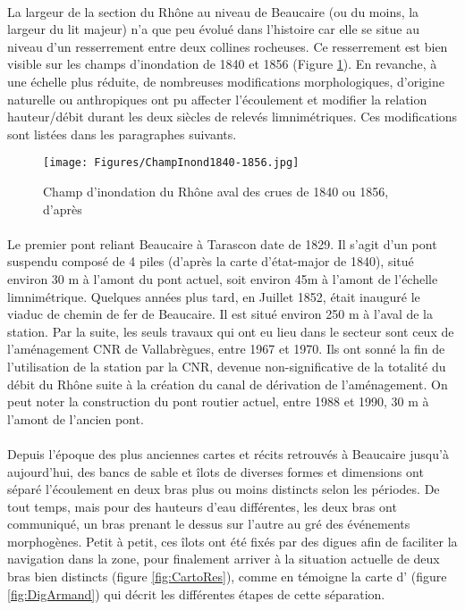 \documentclass[11pt]{article}
\begin{document}
    \paragraph{} La largeur de la section du Rhône au niveau de Beaucaire (ou du moins, la largeur du lit majeur) n'a que peu évolué dans l'histoire car elle se situe au niveau d'un resserrement entre deux collines rocheuses. Ce resserrement est bien visible sur les champs d'inondation de 1840 et 1856 (Figure \ref{Champ1856}). En revanche, à une échelle plus réduite, de nombreuses modifications morphologiques, d'origine naturelle ou anthropiques ont pu affecter l'écoulement et modifier la relation hauteur/débit durant les deux siècles de relevés limnimétriques. Ces modifications sont listées dans les paragraphes suivants.
    
    \begin{figure}[h]
        \centering
        \texttt{[image: Figures/ChampInond1840-1856.jpg]}
        \caption{Champ d'inondation du Rhône aval des crues de 1840 ou 1856, d'après \citet{parde_regime_1925}}
        \label{Champ1856}
    \end{figure}
    

	\paragraph{} Le premier pont reliant Beaucaire à Tarascon date de 1829. Il s'agit d'un pont suspendu composé de 4 piles (d'après la carte d'état-major de 1840), situé environ 30 m à l'amont du pont actuel, soit environ 45m à l'amont de l'échelle limnimétrique. Quelques années plus tard, en Juillet 1852, était inauguré le viaduc de chemin de fer de Beaucaire. Il est situé environ 250 m à l'aval de la station. Par la suite, les seuls travaux qui ont eu lieu dans le secteur sont ceux de l'aménagement CNR de Vallabrègues, entre 1967 et 1970. Ils ont sonné la fin de l'utilisation de la station par la CNR, devenue non-significative de la totalité du débit du Rhône suite à la création du canal de dérivation de l'aménagement. On peut noter la construction du pont routier actuel, entre 1988 et 1990, 30 m à l'amont de l'ancien pont. 
        

        \paragraph{} Depuis l'époque des plus anciennes cartes et récits retrouvés à Beaucaire jusqu'à aujourd'hui, des bancs de sable et îlots de diverses formes et dimensions ont séparé l'écoulement en deux bras plus ou moins distincts selon les périodes. De tout temps, mais pour des hauteurs d'eau différentes, les deux bras ont communiqué, un bras prenant le dessus sur l'autre au gré des événements morphogènes. Petit à petit, ces îlots ont été fixés par des digues afin de faciliter la navigation dans la zone, pour finalement arriver à la situation actuelle de deux bras bien distincts (figure \ref{fig:CartoRes}), comme en témoigne la carte d'\citet{armand_ii_1907} (figure \ref{fig:DigArmand}) qui décrit les différentes étapes de cette séparation. 
        
\end{document}
